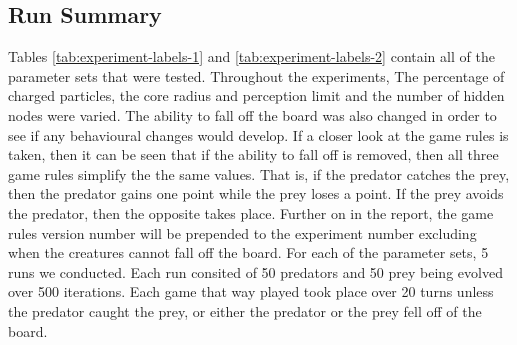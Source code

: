 \subsection{Run Summary}
Tables \ref{tab:experiment-labels-1} and \ref{tab:experiment-labels-2} contain all of the parameter sets that were tested. Throughout the experiments, The percentage of charged particles, the core radius and perception limit and the number of hidden nodes were varied. The ability to fall off the board was also changed in order to see if any behavioural changes would develop. If a closer look at the game rules is taken, then it can be seen that if the ability to fall off is removed, then all three game rules simplify the the same values. That is, if the predator catches the prey, then the predator gains one point while the prey loses a point. If the prey avoids the predator, then the opposite takes place. Further on in the report, the game rules version number will be prepended to the experiment number excluding when the creatures cannot fall off the board. For each of the parameter sets, 5 runs we conducted. Each run consited of 50 predators and 50 prey being evolved over 500 iterations. Each game that way played took place over 20 turns unless the predator caught the prey, or either the predator or the prey fell off of the board.

